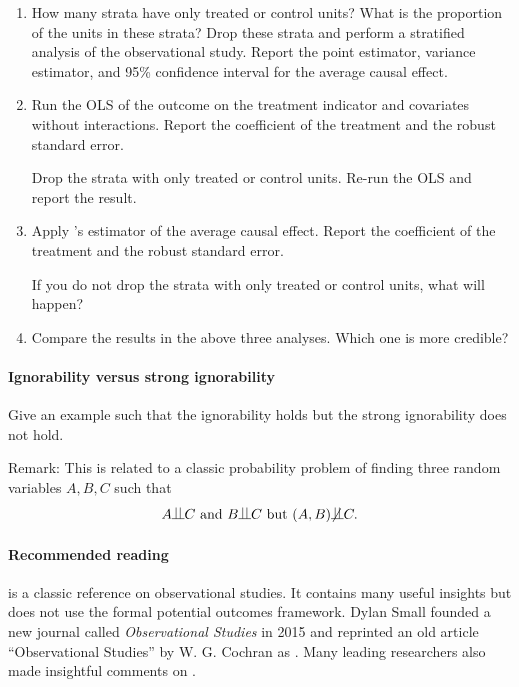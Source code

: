 \begin{enumerate}
[(1)]
\item
How many strata have only treated or control units? What is the proportion of the units in these strata? Drop these strata and perform a stratified analysis of the observational study. Report the point estimator, variance estimator, and 95\% confidence interval for the average causal effect.

\item
Run the OLS of the outcome on the treatment indicator and covariates without interactions. Report the coefficient of the treatment and the robust standard error.

Drop the strata with only treated or control units. Re-run the OLS and report the result. 


\item
Apply \citet{lin2013}'s estimator of the average causal effect. Report the coefficient of the treatment and the robust standard error.

If you do not drop the strata with only treated or control units, what will happen?


\item
Compare the results in the above three analyses. Which one is more credible?

\end{enumerate} 



\paragraph{Ignorability versus strong ignorability}\label{hw::ignorability-difference}


Give an example such that the ignorability holds but the strong ignorability does not hold. 


Remark: This is related to a classic probability problem of finding three random variables $A,B,C$ such that 
$$
A\ind C \text{ and } B\ind C \text{ but } (A,B) \nind C.
$$


\paragraph{Recommended reading}


\citet{cochran1965planning} is a classic reference on observational studies. It contains many useful insights but does not use the formal potential outcomes framework.  
Dylan Small founded a new journal called {\it Observational Studies} in 2015 \citep{small2015introduction} and reprinted an old article ``Observational Studies'' by W. G. Cochran as  \citet{cochran2015}.  Many leading researchers also made insightful comments on  \citet{cochran2015}. 

